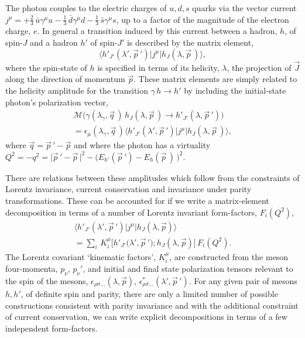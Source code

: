 \documentclass[twocolumn,amsmath,amssymb,prd,10pt,floatfix, 
superscriptaddress,nofootinbib, showpacs, preprintnumbers]{revtex4-1}
\begin{document}
The photon couples to the electric charges of $u,d,s$ quarks via the vector current ${j^\mu = +\tfrac{2}{3}\, \bar{u} \gamma^\mu u - \tfrac{1}{3}\, \bar{d} \gamma^\mu d - \tfrac{1}{3}\, \bar{s} \gamma^\mu s }$, up to a factor of the magnitude of the electron charge, $e$. In general a transition induced by this current between a hadron, $h$, of spin-$J$ and a hadron $h'$ of spin-$J'$ is described by the matrix element,
\begin{equation}
\big\langle h'_{J'}(\lambda',\vec{p}\,') \big| j^\mu \big| h_J(\lambda,\vec{p}\,)\big\rangle, \nonumber
\end{equation}
where the spin-state of $h$ is specified in terms of its helicity, $\lambda$, the projection of $\vec{J}$ along the direction of momentum $\vec{p}$. These matrix elements are simply related to the helicity amplitude for the transition $\gamma\, h \to h'$ by including the initial-state photon's polarization vector,
\begin{multline}
\mathcal{M}\big( \gamma(\lambda_\gamma,\vec{q}\,)\, h_J(\lambda,\vec{p}\, ) \to h'_{J'}(\lambda,\vec{p}\,')  \big) \\
= \epsilon_\mu(\lambda_\gamma, \vec{q}\,) \big\langle h'_{J'}(\lambda',\vec{p}\,') \big| j^\mu \big| h_J(\lambda,\vec{p}\,)\big\rangle, \nonumber
\end{multline}
where $\vec{q} = \vec{p}\,' - \vec{p}$ and where the photon has a virtuality ${Q^2 = -q^2 = \big| \vec{p}\,' - \vec{p} \,\big|^2 - \big(E_{h'}(\vec{p}\,') - E_h(\vec{p}\,)\, \big)^2 }$.


There are relations between these amplitudes which follow from the constraints of Lorentz invariance, current conservation and invariance under parity transformations. These can be accounted for if we write a matrix-element decomposition in terms of a number of Lorentz invariant form-factors, $F_i(Q^2)$,
\begin{multline}
\big\langle h'_{J'}(\lambda',\vec{p}\,') \big| j^\mu \big| h_J(\lambda,\vec{p})\big\rangle \\
= \sum\nolimits_i \, K_i^\mu \big[   h'_{J'}\big(\lambda',\vec{p}\,'); h_{J}(\lambda,\vec{p}) \big] \, F_i(Q^2). \label{decomp}
\end{multline}
The Lorentz covariant `kinematic factors', $K_i^\mu$, are constructed from the meson four-momenta, $p_\nu$, $p_\nu'$, and initial and final state polarization tensors relevant to the spin of the mesons, $\epsilon_{\rho \sigma \ldots}(\lambda, \vec{p})$, $\epsilon^*_{\rho \sigma \ldots}(\lambda', \vec{p}\,')$. For any given pair of mesons $h,h'$, of definite spin and parity, there are only a limited number of possible constructions consistent with parity invariance and with the additional constraint of current conservation, we can write explicit decompositions in terms of a few independent form-factors. 
\end{document}
